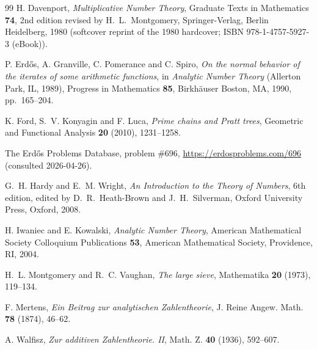 \documentclass[11pt,reqno]{amsart}
\theoremstyle{plain}
\theoremstyle{definition}
\begin{document}
\begin{thebibliography}{99}
H. Davenport, \emph{Multiplicative Number Theory},
Graduate Texts in Mathematics \textbf{74}, 2nd edition revised by H.~L.~Montgomery,
Springer-Verlag, Berlin Heidelberg, 1980 (softcover reprint of the 1980 hardcover;
ISBN 978-1-4757-5927-3 (eBook)).

P. Erd\H{o}s, A. Granville, C. Pomerance and C. Spiro,
\emph{On the normal behavior of the iterates of some arithmetic functions},
in \emph{Analytic Number Theory} (Allerton Park, IL, 1989),
Progress in Mathematics \textbf{85}, Birkh\"auser Boston, MA, 1990, pp.~165--204.

K. Ford, S.~V. Konyagin and F. Luca,
\emph{Prime chains and Pratt trees},
Geometric and Functional Analysis \textbf{20} (2010), 1231--1258.

The Erd\H{o}s Problems Database, problem \#696,
\url{https://erdosproblems.com/696} (consulted 2026-04-26).

G.~H. Hardy and E.~M. Wright,
\emph{An Introduction to the Theory of Numbers},
6th edition, edited by D.~R.~Heath-Brown and J.~H.~Silverman,
Oxford University Press, Oxford, 2008.

H. Iwaniec and E. Kowalski,
\emph{Analytic Number Theory},
American Mathematical Society Colloquium Publications \textbf{53},
American Mathematical Society, Providence, RI, 2004.

H.~L. Montgomery and R.~C. Vaughan,
\emph{The large sieve},
Mathematika \textbf{20} (1973), 119--134.

F. Mertens,
\emph{Ein Beitrag zur analytischen Zahlentheorie},
J. Reine Angew. Math. \textbf{78} (1874), 46--62.

A. Walfisz,
\emph{Zur additiven Zahlentheorie. II},
Math. Z. \textbf{40} (1936), 592--607.

\end{thebibliography}
\end{document}
